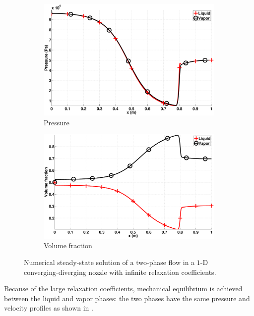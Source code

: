 \documentclass[preprint,10pt]{elsarticle}
\begin{document}
\begin{figure}[H]
        \begin{subfigure}[b]{0.495\textwidth}
                \centering
                \includegraphics[width=\textwidth]{figures/nozzle-aint-1e4_two_phases_pressure.eps}
                \caption{Pressure}
                \label{fig:nozzle-aint-1e4-press}
        \end{subfigure}        
        \begin{subfigure}[b]{0.495\textwidth}
                \centering
                \includegraphics[width=\textwidth]{figures/nozzle-aint-1e4_two_phases_volume_fraction.eps}
                \caption{Volume fraction}
                \label{fig:nozzle-aint-1e4-vf}
        \end{subfigure}
        \caption{Numerical steady-state solution of a two-phase flow in a $1$-D converging-diverging nozzle with infinite relaxation coefficients.}\label{fig:nozzle-aint-1e4-variables}
\end{figure}
%
Because of the large relaxation coefficients, mechanical equilibrium is achieved between the liquid and vapor phases: the two phases have the same pressure and velocity profiles as shown in . 
\end{document}

